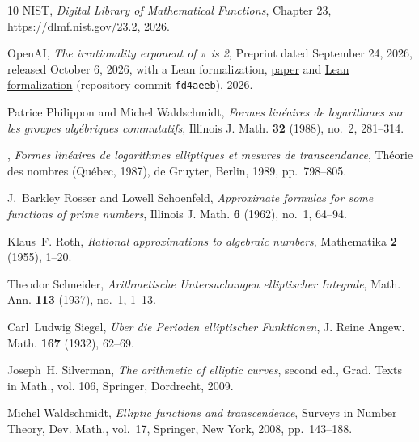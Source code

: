 \documentclass[11pt]{amsart}
\theoremstyle{definition}
\theoremstyle{remark}
\numberwithin{equation}{section}
\begin{document}
\begin{thebibliography}{10}
{NIST}, \emph{Digital {L}ibrary of {M}athematical {F}unctions}, Chapter 23,
  \url{https://dlmf.nist.gov/23.2}, 2026.

{OpenAI}, \emph{The irrationality exponent of {$\pi$} is 2}, Preprint dated
  September 24, 2026, released October 6, 2026, with a Lean formalization,
  \href{https://github.com/openai/math/tree/fd4aeeb2ee4fc729c18d98444fed42fd0529eeeb/preprints/The-irrationality-exponent-of-pi-is-2-September-24-2026}{paper}
  and
  \href{https://github.com/openai/math/tree/fd4aeeb2ee4fc729c18d98444fed42fd0529eeeb/lean/OAI/NumberTheory/PiExponent}{Lean
  formalization} (repository commit \texttt{fd4aeeb}), 2026.

Patrice Philippon and Michel Waldschmidt, \emph{Formes lin\'eaires de
  logarithmes sur les groupes alg\'ebriques commutatifs}, Illinois J. Math.
  \textbf{32} (1988), no.~2, 281--314.

\bysame, \emph{Formes lin\'eaires de logarithmes elliptiques et mesures de
  transcendance}, Th\'eorie des nombres ({Q}u\'ebec, 1987), de Gruyter, Berlin,
  1989, pp.~798--805.

J.~Barkley Rosser and Lowell Schoenfeld, \emph{Approximate formulas for some
  functions of prime numbers}, Illinois J. Math. \textbf{6} (1962), no.~1,
  64--94.

Klaus~F. Roth, \emph{Rational approximations to algebraic numbers}, Mathematika
  \textbf{2} (1955), 1--20.

Theodor Schneider, \emph{Arithmetische {U}ntersuchungen elliptischer
  {I}ntegrale}, Math. Ann. \textbf{113} (1937), no.~1, 1--13.

Carl~Ludwig Siegel, \emph{{\"U}ber die {P}erioden elliptischer {F}unktionen},
  J. Reine Angew. Math. \textbf{167} (1932), 62--69.

Joseph~H. Silverman, \emph{The arithmetic of elliptic curves}, second ed.,
  Grad. Texts in Math., vol. 106, Springer, Dordrecht, 2009.

Michel Waldschmidt, \emph{Elliptic functions and transcendence}, Surveys in
  Number Theory, Dev. Math., vol.~17, Springer, New York, 2008, pp.~143--188.

\end{thebibliography}
\end{document}
